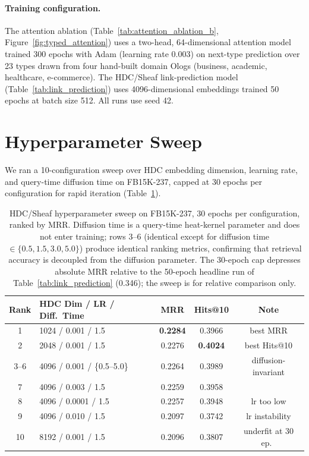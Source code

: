 \paragraph{Training configuration.} The attention ablation
(Table~\ref{tab:attention_ablation_b}, Figure~\ref{fig:typed_attention})
uses a two-head, 64-dimensional attention model trained 300 epochs with
Adam (learning rate 0.003) on next-type prediction over 23 types drawn
from four hand-built domain Ologs (business, academic, healthcare,
e-commerce). The HDC/Sheaf link-prediction model
(Table~\ref{tab:link_prediction}) uses 4096-dimensional embeddings
trained 50 epochs at batch size 512. All runs use seed 42.

\section{Hyperparameter Sweep}
\label{app:sweep}

We ran a 10-configuration sweep over HDC embedding dimension, learning
rate, and query-time diffusion time on FB15K-237, capped at 30 epochs
per configuration for rapid iteration (Table~\ref{tab:sweep}).

\begin{table}[t]
\centering
\caption{HDC/Sheaf hyperparameter sweep on FB15K-237, 30 epochs per
configuration, ranked by MRR. Diffusion time is a query-time heat-kernel
parameter and does not enter training; rows 3--6 (identical except for
diffusion time $\in \{0.5, 1.5, 3.0, 5.0\}$) produce identical ranking
metrics, confirming that retrieval accuracy is decoupled from the
diffusion parameter. The 30-epoch cap depresses absolute MRR relative to
the 50-epoch headline run of Table~\ref{tab:link_prediction} (0.346);
the sweep is for relative comparison only.}
\label{tab:sweep}
\begin{tabular}{clccc}
\toprule
Rank & HDC Dim / LR / Diff.\ Time & MRR & Hits@10 & Note \\
\midrule
1   & 1024 / 0.001 / 1.5      & \textbf{0.2284} & 0.3966 & best MRR \\
2   & 2048 / 0.001 / 1.5      & 0.2276 & \textbf{0.4024} & best Hits@10 \\
3--6 & 4096 / 0.001 / \{0.5--5.0\} & 0.2264 & 0.3989 & diffusion-invariant \\
7   & 4096 / 0.003 / 1.5      & 0.2259 & 0.3958 & \\
8   & 4096 / 0.0001 / 1.5     & 0.2257 & 0.3948 & lr too low \\
9   & 4096 / 0.010 / 1.5      & 0.2097 & 0.3742 & lr instability \\
10  & 8192 / 0.001 / 1.5      & 0.2096 & 0.3807 & underfit at 30 ep.\ \\
\bottomrule
\end{tabular}
\end{table}

